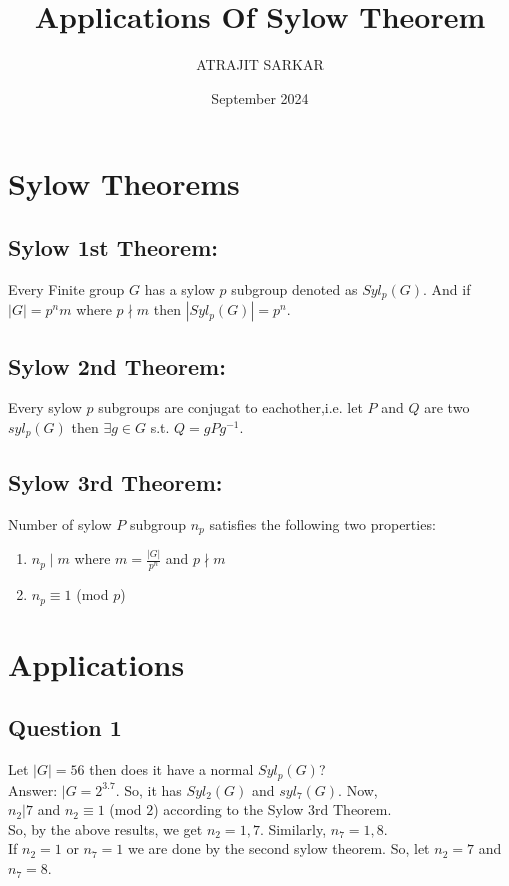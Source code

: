 \documentclass{article}
\title{Applications Of Sylow Theorem}
\author{ATRAJIT SARKAR}
\date{September 2024}
\begin{document}
\maketitle
\tableofcontents

\section{Sylow Theorems}
\subsection{Sylow 1st Theorem:}
Every Finite group $G$ has a sylow $p$ subgroup denoted as $Syl_p(G)$. And if $|G|=p^nm$ where
$p \nmid m$ then $|Syl_p(G)|=p^n$.

\subsection{Sylow 2nd Theorem:}
Every sylow $p$ subgroups are conjugat to eachother,i.e. let $P$ and $Q$ are two $syl_p(G)$ then $\exists g\in G$ s.t. $Q=gPg^{-1}$.

\subsection{Sylow 3rd Theorem:}
Number of sylow $P$ subgroup $n_p$ satisfies the following two properties:
\begin{enumerate}
    
    \item $n_p \mid m$ where $m=\frac{|G|}{p^n}$ and $p \nmid m$
    \item $n_p \equiv 1$ (mod $p$)
\end{enumerate}

\section{Applications}
\subsection{Question 1}
Let $|G|=56$ then does it have a normal $Syl_p(G)$?\\

Answer: $|G=2^3.7$. So, it has $Syl_2(G)$ and $syl_7(G)$. Now,\\
$n_2|7$ and $n_2 \equiv 1$ (mod $2$) according to the Sylow 3rd Theorem.\\
So, by the above results, we get $n_2=1,7$.
Similarly, $n_7=1,8$.\\
If $n_2=1$ or $n_7=1$ we are done by the second sylow theorem. So, let $n_2=7$ and $n_7=8$.\\
\end{document}

